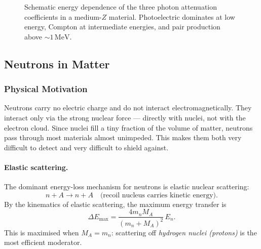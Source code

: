 \begin{figure}[h]
\centering
{}
\caption{Schematic energy dependence of the three photon attenuation coefficients
in a medium-$Z$ material.  Photoelectric dominates at low energy, Compton at
intermediate energies, and pair production above $\sim 1\,\text{MeV}$.}
\label{fig:lec06:photon_processes}
\end{figure}

\subsection{Neutrons in Matter}
\label{subsec:lec06:neutrons}

\subsubsection*{Physical Motivation}
Neutrons carry no electric charge and do not interact electromagnetically.
They interact only via the strong nuclear force — directly with nuclei, not
with the electron cloud.  Since nuclei fill a tiny fraction of the volume of
matter, neutrons pass through most materials almost unimpeded.  This makes them
both very difficult to detect and very difficult to shield against.

\paragraph{Elastic scattering.}
The dominant energy-loss mechanism for neutrons is elastic nuclear scattering:
\begin{equation}
  \label{eq:lec06:neutron_elastic}
  n + A \to n + A\quad\text{(recoil nucleus carries kinetic energy)}.
\end{equation}
By the kinematics of elastic scattering, the maximum energy transfer is
\begin{equation}
  \label{eq:lec06:neutron_transfer}
  \Delta E_\text{max} = \frac{4 m_n M_A}{(m_n + M_A)^2}\,E_n.
\end{equation}
This is maximised when $M_A = m_n$: scattering off \emph{hydrogen nuclei
(protons)} is the most efficient moderator.

